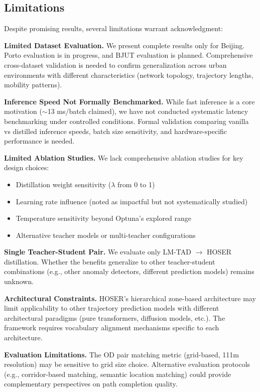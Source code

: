 \subsection{Limitations}
\label{sec:conclusion-limitations}

Despite promising results, several limitations warrant acknowledgment:

\textbf{Limited Dataset Evaluation.} We present complete results only for Beijing. Porto evaluation is in progress, and BJUT evaluation is planned. Comprehensive cross-dataset validation is needed to confirm generalization across urban environments with different characteristics (network topology, trajectory lengths, mobility patterns).

\textbf{Inference Speed Not Formally Benchmarked.} While fast inference is a core motivation ($\sim$13 ms/batch claimed), we have not conducted systematic latency benchmarking under controlled conditions. Formal validation comparing vanilla vs distilled inference speeds, batch size sensitivity, and hardware-specific performance is needed.

\textbf{Limited Ablation Studies.} We lack comprehensive ablation studies for key design choices:
\begin{itemize}[noitemsep,topsep=0pt]
    \item Distillation weight sensitivity ($\lambda$ from 0 to 1)
    \item Learning rate influence (noted as impactful but not systematically studied)
    \item Temperature sensitivity beyond Optuna's explored range
    \item Alternative teacher models or multi-teacher configurations
\end{itemize}

\textbf{Single Teacher-Student Pair.} We evaluate only LM-TAD $\rightarrow$ HOSER distillation. Whether the benefits generalize to other teacher-student combinations (e.g., other anomaly detectors, different prediction models) remains unknown.

\textbf{Architectural Constraints.} HOSER's hierarchical zone-based architecture may limit applicability to other trajectory prediction models with different architectural paradigms (pure transformers, diffusion models, etc.). The framework requires vocabulary alignment mechanisms specific to each architecture.

\textbf{Evaluation Limitations.} The OD pair matching metric (grid-based, 111m resolution) may be sensitive to grid size choice. Alternative evaluation protocols (e.g., corridor-based matching, semantic location matching) could provide complementary perspectives on path completion quality.

